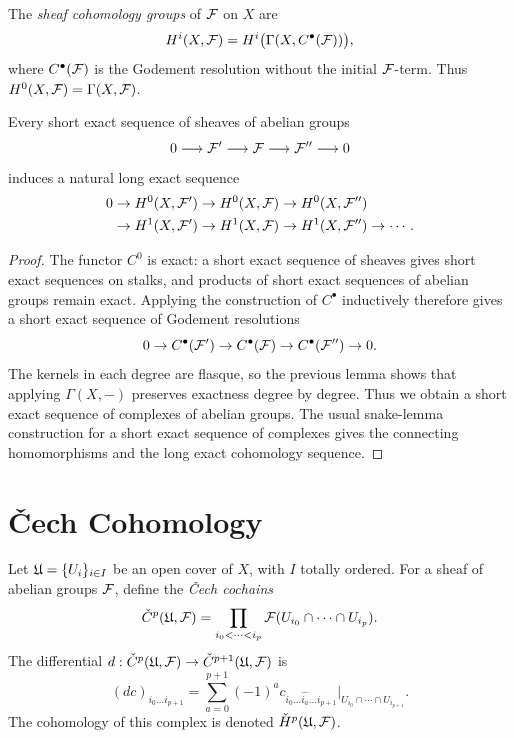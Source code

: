 \begin{definition}
The \emph{sheaf cohomology groups} of \(\mathcal{F}\) on \(X\) are
\[
    H^i(X,\mathcal{F})=H^i\bigl(\Gamma(X,C^\bullet(\mathcal{F}))\bigr),
\]
where \(C^\bullet(\mathcal{F})\) is the Godement resolution without the initial
\(\mathcal{F}\)-term.  Thus \(H^0(X,\mathcal{F})=\Gamma(X,\mathcal{F})\).
\end{definition}

\begin{theorem}
Every short exact sequence of sheaves of abelian groups
\[
    0\longrightarrow \mathcal{F}'\longrightarrow \mathcal{F}\longrightarrow \mathcal{F}''
    \longrightarrow 0
\]
induces a natural long exact sequence
\[
\begin{aligned}
0&\to H^0(X,\mathcal{F}')\to H^0(X,\mathcal{F})\to H^0(X,\mathcal{F}'')\\
&\to H^1(X,\mathcal{F}')\to H^1(X,\mathcal{F})\to H^1(X,\mathcal{F}'')\to\cdots .
\end{aligned}
\]
\end{theorem}

\begin{proof}
The functor \(C^0\) is exact: a short exact sequence of sheaves gives short
exact sequences on stalks, and products of short exact sequences of abelian
groups remain exact.  Applying the construction of \(C^\bullet\) inductively
therefore gives a short exact sequence of Godement resolutions
\[
    0\to C^\bullet(\mathcal{F}')\to C^\bullet(\mathcal{F})\to C^\bullet(\mathcal{F}'')\to0.
\]
The kernels in each degree are flasque, so the previous lemma shows that
applying \(\Gamma(X,-)\) preserves exactness degree by degree.  Thus we obtain
a short exact sequence of complexes of abelian groups.  The usual snake-lemma
construction for a short exact sequence of complexes gives the connecting
homomorphisms and the long exact cohomology sequence.
\end{proof}

\section{\texorpdfstring{\v{C}ech}{Cech} Cohomology}

\begin{definition}
Let \(\mathfrak{U}=\{U_i\}_{i\in I}\) be an open cover of \(X\), with \(I\) totally
ordered.  For a sheaf of abelian groups \(\mathcal{F}\), define the \emph{\v{C}ech
cochains}
\[
    \check{C}^p(\mathfrak{U},\mathcal{F})
    =
    \prod_{i_0<\cdots<i_p}
    \mathcal{F}(U_{i_0}\cap\cdots\cap U_{i_p}).
\]
The differential \(d:\check{C}^p(\mathfrak{U},\mathcal{F})\to\check{C}^{p+1}(\mathfrak{U},\mathcal{F})\) is
\[
    (dc)_{i_0\ldots i_{p+1}}
    =
    \sum_{a=0}^{p+1}(-1)^a
    c_{i_0\ldots\widehat{i_a}\ldots i_{p+1}}
    \big|_{U_{i_0}\cap\cdots\cap U_{i_{p+1}}}.
\]
The cohomology of this complex is denoted \(\check{H}^p(\mathfrak{U},\mathcal{F})\).
\end{definition}

